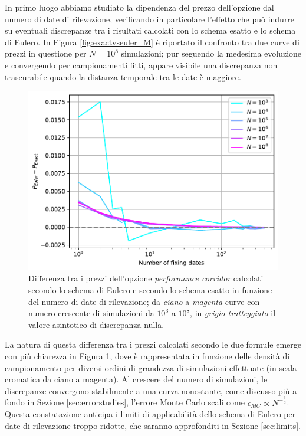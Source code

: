 In primo luogo abbiamo studiato la dipendenza del prezzo dell'opzione dal numero di date di rilevazione, verificando in particolare l'effetto che può indurre su eventuali discrepanze tra i risultati calcolati con lo schema esatto e lo schema di Eulero. In Figura \ref{fig:exactvseuler_M} è riportato il confronto tra due curve di prezzi in questione per $N={10}^8$ simulazioni; pur seguendo la medesima evoluzione e convergendo per campionamenti fitti, appare visibile una discrepanza non trascurabile quando la distanza temporale tra le date è maggiore.

\begin{figure}[t]
    \centering
    \includegraphics[scale=0.5]{graphs/OptionPriceVsM_DiscrepancyVsM_WithDifferentNs.pdf}
    \caption{Differenza tra i prezzi dell'opzione \textit{performance corridor} calcolati secondo lo schema di Eulero e secondo lo schema esatto in funzione del numero di date di rilevazione; da \textit{ciano} a \textit{magenta} curve con numero crescente di simulazioni da ${10}^3$ a ${10}^8$, in \textit{grigio tratteggiato} il valore asintotico di discrepanza nulla.}
    \label{fig:ex_eul_discrep_M}
\end{figure}

La natura di questa differenza tra i prezzi calcolati secondo le due formule emerge con più chiarezza in Figura \ref{fig:ex_eul_discrep_M}, dove è rappresentata in funzione delle densità di campionamento per diversi ordini di grandezza di simulazioni effettuate (in scala cromatica da ciano a magenta). Al crescere del numero di simulazioni, le discrepanze convergono stabilmente a una curva nonostante, come discusso più a fondo in Sezione \ref{sec:errorstudies}, l'errore Monte Carlo scali come $\epsilon_{MC}\propto N^{-\frac{1}{2}}$. Questa constatazione anticipa i limiti di applicabilità dello schema di Eulero per date di rilevazione troppo ridotte, che saranno approfonditi in Sezione \ref{sec:limits}.

